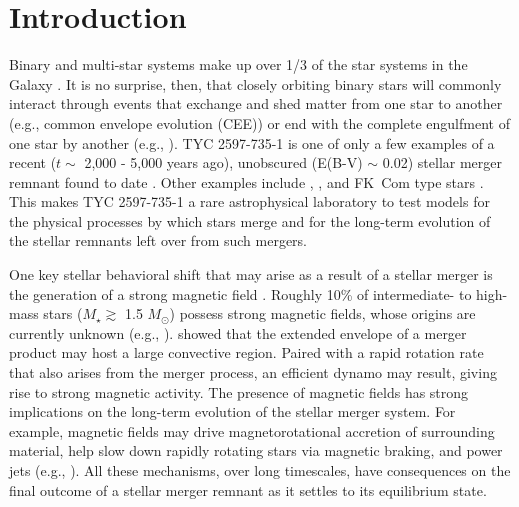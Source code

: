 \documentclass[linenumbers]{aastex631}
\begin{document}
\section{Introduction} \label{sec:intro}
Binary and multi-star systems make up over 1/3 of the star systems in the Galaxy \citep{Raghavan+2010}. It is no surprise, then, that closely orbiting binary stars will commonly interact through events that exchange and shed matter from one star to another (e.g., common envelope evolution (CEE)) or end with the complete engulfment of one star by another (e.g., \citealt{Ivanova+2013}). TYC 2597-735-1 is one of only a few examples of a recent ($t \sim$ 2,000 - 5,000 years ago), unobscured (E(B-V) $\sim$ 0.02) stellar merger remnant found to date \citep{2020Natur.587..387H}.
Other examples include  \citep{Zuckerman_2008},  \citep{Melis_2009}, and FK~Com type stars \citep[see, e.g.,][for a very detailed study of FK Com itself]{2016ApJS..223....5A}.
This makes TYC 2597-735-1 a rare astrophysical laboratory to test models for the physical processes by which stars merge and for the long-term evolution of the stellar remnants left over from such mergers.

One key stellar behavioral shift that may arise as a result of a stellar merger is the generation of a strong magnetic field \citep{Schneider+2016}. Roughly 10\% of intermediate- to high-mass stars ($M_{\star} \gtrsim$ 1.5 $M_{\odot}$) possess strong magnetic fields, whose origins are currently unknown (e.g., \citealt{Donati+2009,Fossati+2015,Grunhut+2017}). \citet{Soker&Tylenda2007} showed that the extended envelope of a merger product may host a large convective region. Paired with a rapid rotation rate that also arises from the merger process, an efficient dynamo may result, giving rise to strong magnetic activity. The presence of magnetic fields has strong implications on the long-term evolution of the stellar merger system. For example, magnetic fields may drive magnetorotational accretion of surrounding material, help slow down rapidly rotating stars via magnetic braking, and power jets (e.g., \citealt{Schneider+2020}). All these mechanisms, over long timescales, have consequences on the final outcome of a stellar merger remnant as it settles to its equilibrium state.
\end{document}
